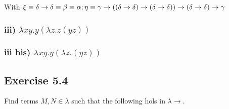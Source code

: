 \documentclass[11pt]{article}
\begin{document}
\begin{center}


\DP
\end{center}

With $\xi \equiv \delta \rightarrow \delta \equiv \beta \equiv \alpha; \\
\eta \equiv \gamma \rightarrow ((\delta \rightarrow \delta) \rightarrow (\delta \rightarrow \delta)) \rightarrow (\delta \rightarrow \delta) \rightarrow \gamma  \  $


\subsubsection*{iii) $\lambda xy.y(\lambda z.z(yz))$}

\subsubsection*{iii bis) $\lambda xy. y(\lambda z.(yz))$}
\begin{center}




\DP
\end{center}

\subsection*{Exercise 5.4}
Find terms $M,N \in \lambda$ such that the following hols in $\lambda \rightarrow$.
\end{document}
